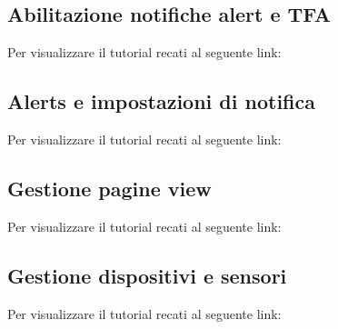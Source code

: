 \subsection{Abilitazione notifiche alert e TFA}
Per visualizzare il tutorial recati al seguente link: 
\url{}

\subsection{Alerts e impostazioni di notifica}
Per visualizzare il tutorial recati al seguente link: 
\url{}

\subsection{Gestione pagine view}
Per visualizzare il tutorial recati al seguente link: 
\url{}

\subsection{Gestione dispositivi e sensori}
Per visualizzare il tutorial recati al seguente link: 
\url{}

